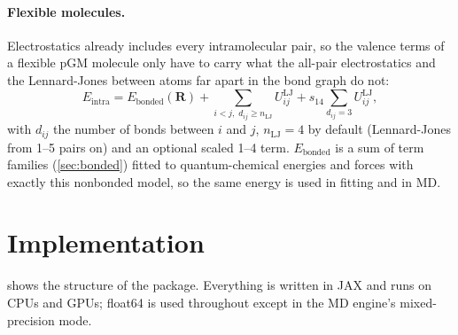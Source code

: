 \documentclass[11pt]{article}
\begin{document}
\paragraph{Flexible molecules.} Electrostatics already includes every intramolecular pair, so the
valence terms of a flexible pGM molecule only have to carry what the all-pair electrostatics and
the Lennard-Jones between atoms far apart in the bond graph do not:
\begin{equation}\label{eq:intra}
E_\mathrm{intra}=E_\mathrm{bonded}(\bm R)+\sum_{i<j,\;d_{ij}\ge n_\mathrm{LJ}}U^\mathrm{LJ}_{ij}
+s_{14}\sum_{d_{ij}=3}U^\mathrm{LJ}_{ij},
\end{equation}
with $d_{ij}$ the number of bonds between $i$ and $j$, $n_\mathrm{LJ}=4$ by default (Lennard-Jones
from 1--5 pairs on) and an optional scaled 1--4 term. $E_\mathrm{bonded}$ is a sum of term
families (\cref{sec:bonded}) fitted to quantum-chemical energies and forces with exactly this
nonbonded model, so the same energy is used in fitting and in MD.

\section{Implementation}\label{sec:impl}

 shows the structure of the package. Everything is written in JAX and runs on
CPUs and GPUs; float64 is used throughout except in the MD engine's mixed-precision mode.
\end{document}
